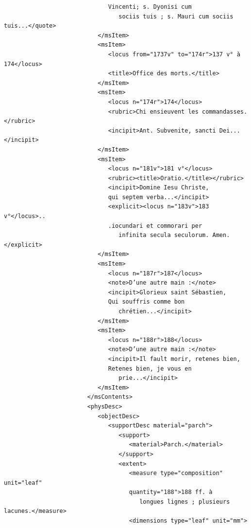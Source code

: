 \documentclass[a4paper,12pt,twoside]{book}
\begin{document}
\begin{verbatim}
                              Vincenti; s. Dyonisi cum
                                 sociis tuis ; s. Mauri cum sociis tuis...</quote>
                           </msItem>
                           <msItem>
                              <locus from="1737v" to="174r">137 v° à 174</locus>
                              <title>Office des morts.</title>
                           </msItem>
                           <msItem>
                              <locus n="174r">174</locus>
                              <rubric>Chi ensieuvent les commandasses.</rubric>
                              <incipit>Ant. Subvenite, sancti Dei...</incipit>
                           </msItem>
                           <msItem>
                              <locus n="181v">181 v°</locus>
                              <rubric><title>Oratio.</title></rubric>
                              <incipit>Domine Iesu Christe, 
                              qui septem verba...</incipit>
                              <explicit><locus n="183v">183 v°</locus>..
                              .iocundari et commorari per
                                 infinita secula seculorum. Amen.</explicit>
                           </msItem>
                           <msItem>
                              <locus n="187r">187</locus>
                              <note>D’une autre main :</note>
                              <incipit>Glorieux saint Sébastien, 
                              Qui souffris comme bon
                                 chrétien...</incipit>
                           </msItem>
                           <msItem>
                              <locus n="188r">188</locus>
                              <note>D’une autre main :</note>
                              <incipit>Il fault morir, retenes bien,
                              Retenes bien, je vous en
                                 prie...</incipit>
                           </msItem>
                        </msContents>
                        <physDesc>
                           <objectDesc>
                              <supportDesc material="parch">
                                 <support>
                                    <material>Parch.</material>
                                 </support>
                                 <extent>
                                    <measure type="composition" unit="leaf"
                                    quantity="188">188 ff. à
                                       longues lignes ; plusieurs lacunes.</measure>
                                    <dimensions type="leaf" unit="mm">

\end{verbatim}
\end{document}
